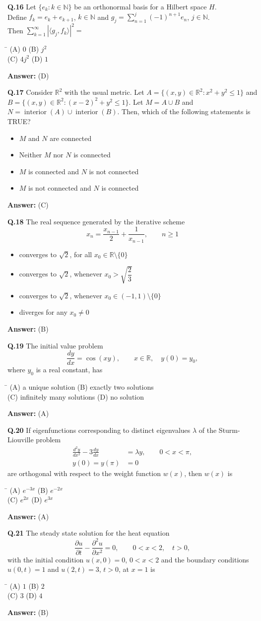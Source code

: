 \documentclass[11pt,a4paper]{article}
\newcommand{\optsfourA}[4]{%
  \begin{tabbing}
    \hspace{0.48\linewidth}\=\kill
    (A) #1 \> (B) #2 \\[2pt]
    (C) #3 \> (D) #4
  \end{tabbing}%
}
\newcommand{\optslistA}[4]{%
  \begin{itemize}
    \setlength{\itemsep}{2pt}\setlength{\parskip}{0pt}
    \item[(A)] #1
    \item[(B)] #2
    \item[(C)] #3
    \item[(D)] #4
  \end{itemize}%
}
\newcommand{\ans}[1]{\textbf{Answer:} #1\par\medskip}
\begin{document}
\textbf{Q.16} Let $\{e_k : k \in \mathbb{N}\}$ be an orthonormal basis for a Hilbert space $H$.\\
Define $f_k = e_k + e_{k+1}$, $k \in \mathbb{N}$ and $g_j = \displaystyle\sum_{n=1}^{j} (-1)^{n+1} e_n$, $j \in \mathbb{N}$.\\
Then $\displaystyle\sum_{k=1}^{\infty} |\langle g_j, f_k \rangle|^2 =$
\optsfourA{$0$}{$j^2$}{$4j^2$}{$1$}
\ans{(D)}

\textbf{Q.17} Consider $\mathbb{R}^2$ with the usual metric. Let $A = \{(x, y) \in \mathbb{R}^2 : x^2 + y^2 \le 1\}$ and $B = \{(x, y) \in \mathbb{R}^2 : (x - 2)^2 + y^2 \le 1\}$. Let $M = A \cup B$ and $N = \operatorname{interior}(A) \cup \operatorname{interior}(B)$. Then, which of the following statements is TRUE?
\optslistA{$M$ and $N$ are connected}{Neither $M$ nor $N$ is connected}{$M$ is connected and $N$ is not connected}{$M$ is not connected and $N$ is connected}
\ans{(C)}

\textbf{Q.18} The real sequence generated by the iterative scheme
\[
  x_n = \frac{x_{n-1}}{2} + \frac{1}{x_{n-1}}, \qquad n \ge 1
\]
\optslistA{converges to $\sqrt{2}$, for all $x_0 \in \mathbb{R} \setminus \{0\}$}{converges to $\sqrt{2}$, whenever $x_0 > \sqrt{\dfrac{2}{3}}$}{converges to $\sqrt{2}$, whenever $x_0 \in (-1, 1) \setminus \{0\}$}{diverges for any $x_0 \neq 0$}
\ans{(B)}

\textbf{Q.19} The initial value problem
\[
  \frac{dy}{dx} = \cos(xy), \qquad x \in \mathbb{R},\quad y(0) = y_0,
\]
where $y_0$ is a real constant, has
\optsfourA{a unique solution}{exactly two solutions}{infinitely many solutions}{no solution}
\ans{(A)}

\textbf{Q.20} If eigenfunctions corresponding to distinct eigenvalues $\lambda$ of the Sturm-Liouville problem
\begin{align*}
  \frac{d^2 y}{dx^2} - 3\frac{dy}{dx} &= \lambda y, \qquad 0 < x < \pi, \\
  y(0) = y(\pi) &= 0
\end{align*}
are orthogonal with respect to the weight function $w(x)$, then $w(x)$ is
\optsfourA{$e^{-3x}$}{$e^{-2x}$}{$e^{2x}$}{$e^{3x}$}
\ans{(A)}

\textbf{Q.21} The steady state solution for the heat equation
\[
  \frac{\partial u}{\partial t} - \frac{\partial^2 u}{\partial x^2} = 0, \qquad 0 < x < 2,\quad t > 0,
\]
with the initial condition $u(x, 0) = 0$, $0 < x < 2$ and the boundary conditions $u(0, t) = 1$ and $u(2, t) = 3$, $t > 0$, at $x = 1$ is
\optsfourA{$1$}{$2$}{$3$}{$4$}
\ans{(B)}
\end{document}
